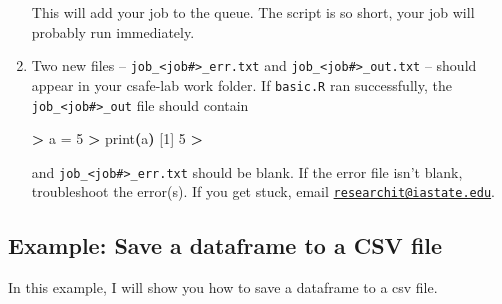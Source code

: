 \documentclass[
]{book}
\newenvironment{Shaded}{\begin{snugshade}}{\end{snugshade}}
\newcommand{\ExtensionTok}[1]{#1}
\newcommand{\KeywordTok}[1]{\textcolor[rgb]{0.13,0.29,0.53}{\textbf{#1}}}
\newcommand{\NormalTok}[1]{#1}
\newcommand{\OperatorTok}[1]{\textcolor[rgb]{0.81,0.36,0.00}{\textbf{#1}}}
\begin{document}
\begin{enumerate}
\begin{Shaded}
\end{Shaded}

  This will add your job to the queue. The script is so short, your job will probably run immediately.
\item
  Two new files -- \texttt{job\_\textless{}job\#\textgreater{}\_err.txt} and \texttt{job\_\textless{}job\#\textgreater{}\_out.txt} -- should appear in your csafe-lab work folder. If \texttt{basic.R} ran successfully, the \texttt{job\_\textless{}job\#\textgreater{}\_out} file should contain

\begin{Shaded}
\begin{Highlighting}[]
\OperatorTok{\textgreater{}}\NormalTok{ a }\ExtensionTok{=}\NormalTok{ 5}
\OperatorTok{\textgreater{}}\NormalTok{ print}\KeywordTok{(}\ExtensionTok{a}\KeywordTok{)}
\ExtensionTok{[1]}\NormalTok{ 5}
\OperatorTok{\textgreater{}} 
\end{Highlighting}
\end{Shaded}

  and \texttt{job\_\textless{}job\#\textgreater{}\_err.txt} should be blank. If the error file isn't blank, troubleshoot the error(s). If you get stuck, email \href{mailto:researchit@iastate.edu}{\nolinkurl{researchit@iastate.edu}}.
\end{enumerate}

\hypertarget{ex-save}{%
\subsection{Example: Save a dataframe to a CSV file}\label{ex-save}}

In this example, I will show you how to save a dataframe to a csv file.
\end{document}
